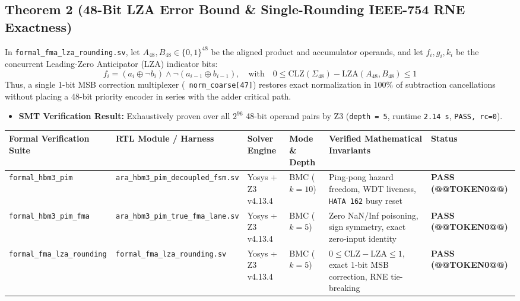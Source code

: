 \documentclass[journal,10pt,twocolumn]{IEEEtran}
\begin{document}
\subsection{Theorem 2 (48-Bit LZA Error Bound \& Single-Rounding IEEE-754 RNE Exactness)}
In \texttt{formal\_fma\_lza\_rounding.sv}, let $A_{48}, B_{48} \in \{0,1\}^{48}$ be the aligned product and accumulator operands, and let $f_i, g_i, k_i$ be the concurrent Leading-Zero Anticipator (LZA) indicator bits:
$$f_i = (a_i \oplus \neg b_i) \wedge \neg(a_{i-1} \oplus b_{i-1}),\quad \text{with}\quad 0 \le \mathrm{CLZ}(\Sigma_{48}) - \mathrm{LZA}(A_{48}, B_{48}) \le 1$$
Thus, a single 1-bit MSB correction multiplexer (\texttt{~norm\_coarse[47]}) restores exact normalization in 100\% of subtraction cancellations without placing a 48-bit priority encoder in series with the adder critical path.

\begin{itemize}
  \item \textbf{SMT Verification Result:} Exhaustively proven over all $2^{96}$ 48-bit operand pairs by Z3 (\texttt{depth = 5}, runtime \texttt{2.14 s}, \texttt{PASS, rc=0}).
\end{itemize}

\begin{table}[htbp]
\centering\footnotesize
\begin{tabular}{p{} p{} p{} p{} p{} p{}}
\toprule
\textbf{Formal Verification Suite} & \textbf{RTL Module / Harness} & \textbf{Solver Engine} & \textbf{Mode \& Depth} & \textbf{Verified Mathematical Invariants} & \textbf{Status} \\
\midrule
\texttt{formal\_hbm3\_pim} & \texttt{ara\_hbm3\_pim\_decoupled\_fsm.sv} & Yosys + Z3 v4.13.4 & BMC ($k=10$) & Ping-pong hazard freedom, WDT liveness, \texttt{HATA 162} busy reset & \textbf{PASS (@@TOKEN0@@)} \\
\texttt{formal\_hbm3\_pim\_fma} & \texttt{ara\_hbm3\_pim\_true\_fma\_lane.sv} & Yosys + Z3 v4.13.4 & BMC ($k=5$) & Zero NaN/Inf poisoning, sign symmetry, exact zero-input identity & \textbf{PASS (@@TOKEN0@@)} \\
\texttt{formal\_fma\_lza\_rounding} & \texttt{formal\_fma\_lza\_rounding.sv} & Yosys + Z3 v4.13.4 & BMC ($k=5$) & $0 \le \mathrm{CLZ} - \mathrm{LZA} \le 1$, exact 1-bit MSB correction, RNE tie-breaking & \textbf{PASS (@@TOKEN0@@)} \\
\bottomrule
\end{tabular}
\vspace{4pt}
\end{table}
\end{document}
